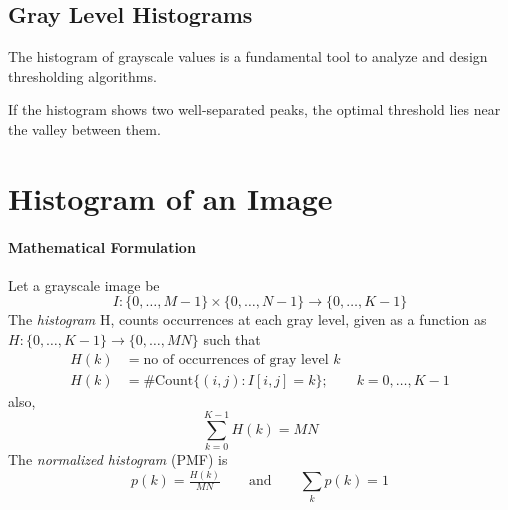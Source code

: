 \subsection{Gray Level Histograms}
The histogram of grayscale values is a fundamental tool to analyze and design thresholding algorithms.

{If the histogram shows two well-separated peaks, the optimal threshold lies near the valley between them.}



\section{Histogram of an Image}

\paragraph{Mathematical Formulation}

Let a grayscale image be
$$I:\{0,\dots,M\!-\!1\}\times\{0,\dots,N\!-\!1\}\to\{0,\dots,K\!-\!1\}$$
The \emph{histogram} H, counts occurrences at each gray level, given as a function as $H:\{0,\dots,K\!-\!1\}\to\{0,\dots,MN\}$ such that 
\begin{align*}
H(k) &= \text{no of occurrences of gray level } k \\
H(k) &= \#\text{Count}\{(i,j): I[i,j]=k\} ; \qquad k=0,\dots,K-1
\end{align*}
also, 
\[
\sum_{k=0}^{K-1} H(k)=MN
\]
\noindent The \emph{normalized histogram} (PMF) is 
$$p(k)=\tfrac{H(k)}{MN} \qquad \text{and} \qquad  \sum_k p(k)=1$$

